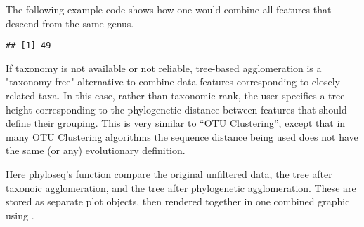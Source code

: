 The following example code shows how one
would combine all features that descend from the same genus.

\begin{knitrout}
\color{fgcolor}\begin{kframe}
\begin{alltt}
\hlstd{(}  \hlstd{=} \hlstd{))}
\end{alltt}
\begin{verbatim}
## [1] 49
\end{verbatim}
\begin{alltt}
 \hlkwb{=}  \hlstd{,}  \hlstd{=} \hlstd{)}
\end{alltt}
\end{kframe}
\end{knitrout}

If taxonomy is not available or not reliable,
tree-based agglomeration is a "taxonomy-free"
alternative to combine data features corresponding to closely-related taxa.
In this case, rather than taxonomic rank, the user specifies
a tree height corresponding to the phylogenetic distance between features
that should define their grouping.
This is very similar to ``OTU Clustering'',
except that in many OTU Clustering algorithms the sequence distance being used
does not have the same (or any) evolutionary definition.

\begin{knitrout}
\color{fgcolor}\begin{kframe}
\begin{alltt}
 \hlkwb{=} 
 \hlkwb{=}   
\end{alltt}
\end{kframe}
\end{knitrout}

Here phyloseq's  function
compare the original unfiltered data,
the tree after taxonoic agglomeration,
and the tree after phylogenetic agglomeration.
These are stored as separate plot objects,
then rendered together in one combined graphic
using .

